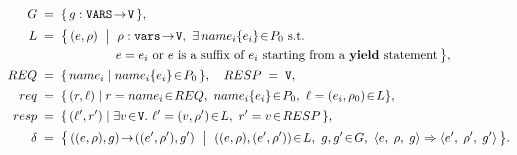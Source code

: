 
\[
\begin{aligned}
	G \;&=\; \{\, g : \texttt{VARS}\!\to\! \texttt{V} \,\},\\[0.3ex]
	L \;&=\; \bigl\{\, (e,\rho)\ \bigm|\ \rho:\texttt{vars}\!\to\! \texttt{V},\ \exists\,name_i\{e_i\}\!\in\! P_0\ \text{s.t.} \\[-0.2ex]
	&\qquad\quad\qquad\quad e=e_i \text{ or } e \text{ is a suffix of } e_i \text{ starting from a } \yieldkw \text{ statement}\,\bigr\},\\[0.3ex]
	REQ \;&=\; \{\, name_i \mid name_i\{e_i\}\!\in\! P_0 \,\},\quad RESP \;=\; \texttt{V},\\[0.3ex]
	req \;&=\; \{\, (r,\ell) \mid r=name_i\!\in\!REQ,\ name_i\{e_i\}\!\in\! P_0,\ \ell=(e_i,\rho_0)\!\in\!L\},\\[0.3ex]
	resp \;&=\; \{\, (\ell',r') \mid \exists v\!\in\!\texttt{V}.\ \ell'=(v,\rho')\!\in\!L,\ r'=v\!\in\!RESP \,\},\\[0.3ex]
	\delta \;&=\; \bigl\{\, ((e,\rho),g)\!\to\!((e',\rho'),g') \ \bigm|\ ((e,\rho),(e',\rho'))\!\in\!L,\ g,g'\!\in\!G,\ 
	\cfg{e}{\rho}{g} \pstep \cfg{e'}{\rho'}{g'} \,\bigr\}.
\end{aligned}
\]


